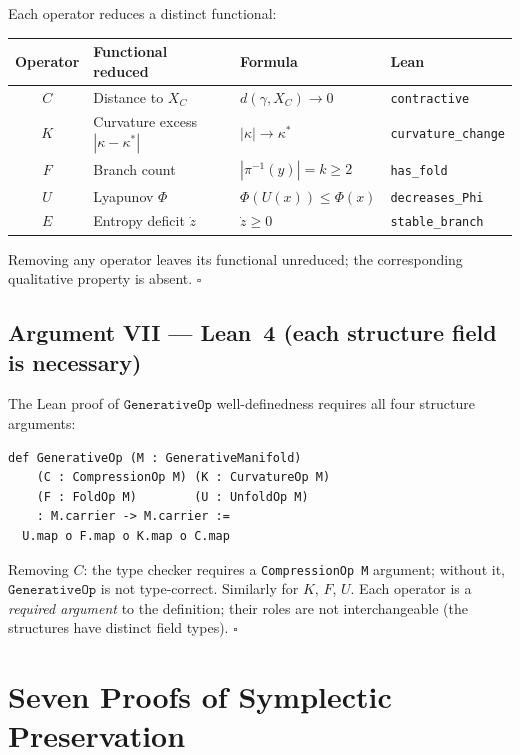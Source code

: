 \documentclass[14pt,a4paper]{extarticle}
\begin{document}
Each operator reduces a distinct functional:
\begin{center}
\begin{tabular}{clll}
\toprule
Operator & Functional reduced & Formula & Lean \\
\midrule
$C$ & Distance to $X_C$ & $d(\gamma, X_C) \to 0$ & \texttt{contractive} \\
$K$ & Curvature excess $|\kappa - \kappa^*|$ & $|\kappa| \to \kappa^*$ & \texttt{curvature\_change} \\
$F$ & Branch count & $|\pi^{-1}(y)| = k \ge 2$ & \texttt{has\_fold} \\
$U$ & Lyapunov $\Phi$ & $\Phi(U(x)) \le \Phi(x)$ & \texttt{decreases\_Phi} \\
$E$ & Entropy deficit $\dot z$ & $\dot z \ge 0$ & \texttt{stable\_branch} \\
\bottomrule
\end{tabular}
\end{center}
Removing any operator leaves its functional unreduced;
the corresponding qualitative property is absent.  \hfill $\square$

\subsection*{Argument VII\; — Lean~4 (each structure field is necessary)}

The Lean proof of $\texttt{GenerativeOp}$ well-definedness requires
all four structure arguments:
\begin{verbatim}
def GenerativeOp (M : GenerativeManifold)
    (C : CompressionOp M) (K : CurvatureOp M)
    (F : FoldOp M)        (U : UnfoldOp M)
    : M.carrier -> M.carrier :=
  U.map o F.map o K.map o C.map
\end{verbatim}
Removing $C$: the type checker requires a \texttt{CompressionOp M}
argument; without it, $\texttt{GenerativeOp}$ is not type-correct.
Similarly for $K$, $F$, $U$.
Each operator is a \emph{required argument} to the definition;
their roles are not interchangeable (the structures have distinct
field types).  \hfill $\square$

\section{Seven Proofs of Symplectic Preservation}
\label{sec:symplectic-seven}
\end{document}
